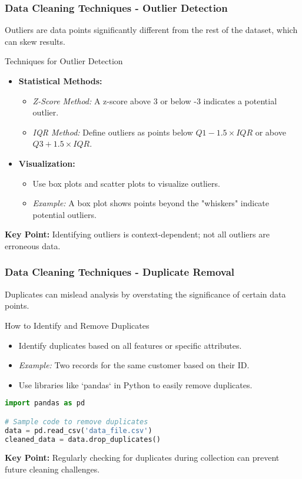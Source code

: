 \documentclass{beamer}
\begin{document}
\begin{frame}[fragile]
    \frametitle{Data Cleaning Techniques - Outlier Detection}
    Outliers are data points significantly different from the rest of the dataset, which can skew results.

    \begin{block}{Techniques for Outlier Detection}
        \begin{itemize}
            \item \textbf{Statistical Methods:} 
            \begin{itemize}
                \item \textit{Z-Score Method:} A z-score above 3 or below -3 indicates a potential outlier.
                \item \textit{IQR Method:} Define outliers as points below \(Q1 - 1.5 \times IQR\) or above \(Q3 + 1.5 \times IQR\).
            \end{itemize}
            \item \textbf{Visualization:} 
            \begin{itemize}
                \item Use box plots and scatter plots to visualize outliers.
                \item \textit{Example:} A box plot shows points beyond the "whiskers" indicate potential outliers.
            \end{itemize}
        \end{itemize}
    \end{block}
    
    \textbf{Key Point:} Identifying outliers is context-dependent; not all outliers are erroneous data.
\end{frame}

\begin{frame}[fragile]
    \frametitle{Data Cleaning Techniques - Duplicate Removal}
    Duplicates can mislead analysis by overstating the significance of certain data points.

    \begin{block}{How to Identify and Remove Duplicates}
        \begin{itemize}
            \item Identify duplicates based on all features or specific attributes.
                \item \textit{Example:} Two records for the same customer based on their ID.
            \item Use libraries like `pandas` in Python to easily remove duplicates.
        \end{itemize} 

        \begin{lstlisting}[language=Python]
import pandas as pd

# Sample code to remove duplicates
data = pd.read_csv('data_file.csv')
cleaned_data = data.drop_duplicates()
        \end{lstlisting}
    \end{block}

    \textbf{Key Point:} Regularly checking for duplicates during collection can prevent future cleaning challenges.
\end{frame}
\end{document}
